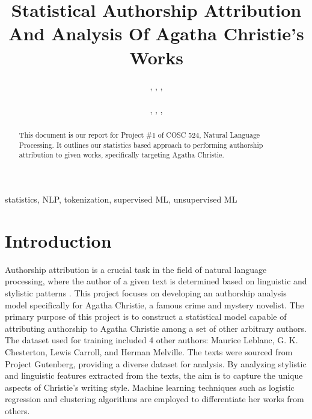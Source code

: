 \documentclass[journal]{IEEEtran} %
\begin{document}
\title{Statistical Authorship Attribution And Analysis Of Agatha
Christie’s Works
}

\author{%
    , 
    , 
    , 
    \\%
    \\%
    , 
    , 
    , 
}

\maketitle

\begin{abstract}
    This document is our report for Project \#1 of COSC 524, Natural Language Processing. It outlines our statistics based approach to performing authorship attribution to given works, specifically targeting Agatha Christie.
\end{abstract}

\begin{IEEEkeywords}
    statistics, NLP, tokenization, supervised ML, unsupervised ML
\end{IEEEkeywords}

\section{Introduction}
Authorship attribution is a crucial task in the field of natural language processing, where the author of a given text is determined based on linguistic and stylistic patterns \cite{misini2022}. This project focuses on developing an authorship analysis model specifically for Agatha Christie, a famous crime and mystery novelist. The primary purpose of this project is to construct a statistical model capable of attributing authorship to Agatha Christie among a set of other arbitrary authors. The dataset used for training included 4 other authors: Maurice Leblanc, G. K. Chesterton, Lewis Carroll, and Herman Melville. The texts were sourced from Project Gutenberg, providing a diverse dataset for analysis. By analyzing stylistic and linguistic features extracted from the texts, the aim is to capture the unique aspects of Christie's writing style. Machine learning techniques such as logistic regression and clustering algorithms are employed to differentiate her works from others.
\end{document}
